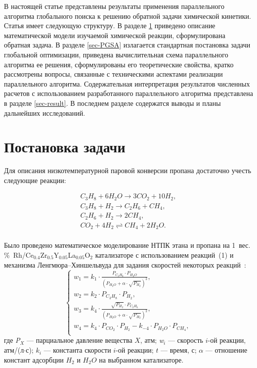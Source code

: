 \documentclass{cmi}
\begin{document}
В настоящей статье представлены результаты применения параллельного алгоритма глобального поиска к решению обратной задачи химической кинетики. Статья имеет следующую структуру. 
В разделе \ref{sec-problem} приведено описание математической модели изучаемой химической реакции, сформулирована обратная задача.
В разделе \ref{sec-PGSA} излагается стандартная постановка задачи глобальной оптимизации, приведена вычислительная схема параллельного алгоритма ее решения, сформулированы его теоретические свойства, кратко рассмотрены вопросы, связанные с техническими аспектами реализации параллельного алгоритма.
Содержательная интерпретация результатов численных расчетов с использованием разработанного параллельного алгоритма представлена в разделе \ref{sec-result}.
В последнем разделе содержатся выводы и планы дальнейших исследований.

\section{Постановка задачи}
\label{sec-problem}

Для описания низкотемпературной паровой конверсии пропана достаточно учесть следующие реакции:

\begin{equation}\label{eq1}
\begin{array}{l}
\displaystyle C_{3}H_{8} + 6H_{2}O \rightarrow 3CO_{2} + 10H_{2}, \\
\displaystyle C_{3}H_{8} + H_{2} \rightarrow C_{2}H_{6} + CH_{4}, \\
\displaystyle C_{2}H_{6} + H_{2} \rightarrow 2CH_{4}, \\
\displaystyle CO_{2} + 4H_{2} \rightleftharpoons CH_{4} + 2H_{2}O. \\
\end{array}
\end{equation}

Было проведено математическое моделирование НТПК этана и пропана на 1~вес.\,\%~Rh/Ce$_{0.4}$Zr$_{0.5}$Y$_{0.05}$La$_{0.05}$O$_{2}$ катализаторе с использованием реакций~(1) и механизма Ленгмюра--Хиншельвуда для задания скоростей некоторых реакций~\cite{ArcotumapathyAAVAA2015,BatebiAM2021}:
\begin{equation}
\begin{cases}
\displaystyle w_{1} = k_{1} \cdot \frac{P_{C_{3}H_{8}}\cdot P_{H_{2}O}}{(P_{H_{2}O}+\alpha\cdot\sqrt{P_{H_{2}}})^2}, \\
\displaystyle w_{2} = k_{2} \cdot P_{C_{3}H_{8}} \cdot P_{H_{2}}, \\
\displaystyle w_{3} = k_{4}\cdot \frac{\sqrt{P_{H_{2}}}\cdot P_{C_{2}H_{6}}}{(P_{H_{2}O}+\alpha\cdot\sqrt{P_{H_{2}}})^2},\\
\displaystyle w_{4} = k_{4}\cdot P_{CO_{2}}\cdot P_{H_{2}}-k_{-4}\cdot P_{H_{2}O}\cdot P_{CH_{4}},\\
\end{cases}
\end{equation}
где \textit{P}$_{X}$ --- парциальное давление вещества $X$, атм; \textit{w}$_{i}$ --- скорость $i$-ой реакции, атм/(л$\cdot$с); $k_{i}$ --- константа скорости $i$-ой реакции; $t$ --- время, с; $\alpha$ --- отношение констант адсорбции $H_{2}$ и $H_{2}O$ на выбранном катализаторе.
\end{document}
